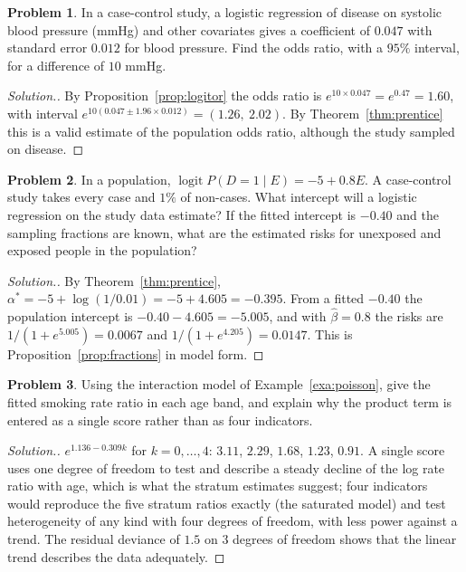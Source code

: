 \documentclass[11pt,a4paper]{article}
\numberwithin{equation}{section}
\theoremstyle{definition}
\newtheorem{problemx}{Problem}[subsection]
\newenvironment{problem}{\begin{problemx}}{\end{problemx}}
\newenvironment{solution}
  {\renewcommand{\qedsymbol}{}\begin{proof}[\textit{Solution}.]}
  {\end{proof}}
\begin{document}
\begin{problem}
In a case-control study, a logistic regression of disease on systolic blood pressure (mmHg) and other covariates gives a coefficient of
$0.047$ with standard error $0.012$ for blood pressure. Find the odds ratio, with a $95\%$ interval, for a difference of $10$ mmHg.
\end{problem}

\begin{solution}
By Proposition~\ref{prop:logitor} the odds ratio is $e^{10 \times 0.047} = e^{0.47} = 1.60$, with interval $e^{10(0.047 \pm 1.96 \times 0.012)} = (1.26,\ 2.02)$. By
Theorem~\ref{thm:prentice} this is a valid estimate of the population odds ratio, although the study sampled on disease.
\end{solution}

\begin{problem}
In a population, $\operatorname{logit} P(D = 1 \mid E) = -5 + 0.8E$. A case-control study takes every case and $1\%$ of non-cases. What intercept will a logistic regression
on the study data estimate? If the fitted intercept is $-0.40$ and the sampling fractions are known, what are the estimated risks for
unexposed and exposed people in the population?
\end{problem}

\begin{solution}
By Theorem~\ref{thm:prentice}, $\alpha^* = -5 + \log(1/0.01) = -5 + 4.605 = -0.395$. From a fitted $-0.40$ the population intercept is $-0.40 - 4.605 = -5.005$, and with $\hat\beta = 0.8$
the risks are $1/(1 + e^{5.005}) = 0.0067$ and $1/(1 + e^{4.205}) = 0.0147$. This is Proposition~\ref{prop:fractions} in model form.
\end{solution}

\begin{problem}
Using the interaction model of Example~\ref{exa:poisson}, give the fitted smoking rate ratio in each age band, and explain why
the product term is entered as a single score rather than as four indicators.
\end{problem}

\begin{solution}
$e^{1.136 - 0.309k}$ for $k = 0, \dots, 4$: $3.11$, $2.29$, $1.68$, $1.23$, $0.91$. A single score uses one degree of freedom to test and describe a steady decline of the
log rate ratio with age, which is what the stratum estimates suggest; four indicators would reproduce the five stratum ratios exactly
(the saturated model) and test heterogeneity of any kind with four degrees of freedom, with less power against a trend. The residual
deviance of $1.5$ on $3$ degrees of freedom shows that the linear trend describes the data adequately.
\end{solution}
\end{document}
